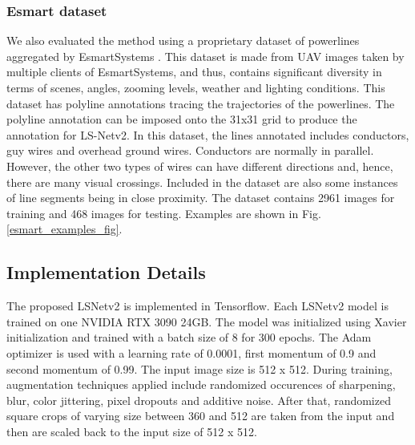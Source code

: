 \documentclass[journal]{IEEEtran}
\newcommand{\commentM}[1]{\textbf{\textcolor{blue}{M: #1}}}
\begin{document}
\subsubsection{Esmart dataset}
We also evaluated the method using a proprietary dataset of powerlines aggregated by EsmartSystems \cite{esmart_website}. This dataset is made from UAV images taken by multiple clients of EsmartSystems, and thus, contains significant diversity in terms of scenes, angles, zooming levels, weather and lighting conditions. This dataset has polyline annotations tracing the trajectories of the powerlines. The polyline annotation can be imposed onto the 31x31 grid to produce the annotation for LS-Netv2.
In this dataset, the lines annotated includes conductors, guy wires and overhead ground wires. Conductors are normally in parallel. However, the other two types of wires can have different directions and, hence, there are many visual crossings. Included in the dataset are also some instances of line segments being in close proximity. The dataset contains 2961 images for training and 468 images for testing. Examples are shown in Fig. \ref{esmart_examples_fig}.


\subsection{Implementation Details}

The proposed LSNetv2 is implemented in Tensorflow. Each LSNetv2 model is trained on one NVIDIA RTX 3090 24GB. The model was initialized using Xavier initialization \cite{xavier} and trained with a batch size of 8 for 300 epochs. The Adam optimizer \cite{adam} is used with a learning rate of 0.0001, first momentum of 0.9 and second momentum of 0.99. The input image size is 512 x 512. During training, augmentation techniques applied include randomized occurences of sharpening, blur, color jittering, pixel dropouts and additive noise. After that, randomized square crops of varying size between 360 and 512 are taken from the input and then are scaled back to the input size of 512 x 512.
\end{document}
